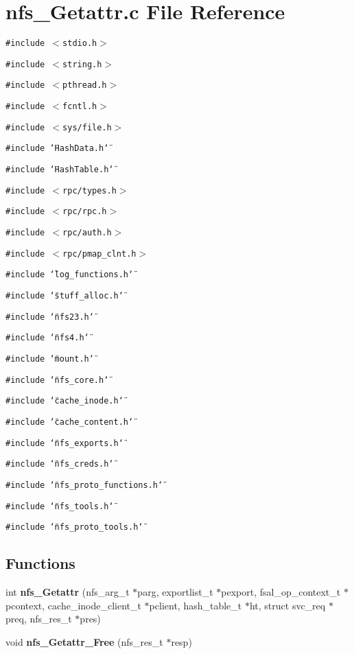\section{nfs\_\-Getattr.c File Reference}
\label{nfs__Getattr_8c}
{\tt \#include $<$stdio.h$>$}\par
{\tt \#include $<$string.h$>$}\par
{\tt \#include $<$pthread.h$>$}\par
{\tt \#include $<$fcntl.h$>$}\par
{\tt \#include $<$sys/file.h$>$}\par
{\tt \#include \char`\"{}HashData.h\char`\"{}}\par
{\tt \#include \char`\"{}HashTable.h\char`\"{}}\par
{\tt \#include $<$rpc/types.h$>$}\par
{\tt \#include $<$rpc/rpc.h$>$}\par
{\tt \#include $<$rpc/auth.h$>$}\par
{\tt \#include $<$rpc/pmap\_\-clnt.h$>$}\par
{\tt \#include \char`\"{}log\_\-functions.h\char`\"{}}\par
{\tt \#include \char`\"{}stuff\_\-alloc.h\char`\"{}}\par
{\tt \#include \char`\"{}nfs23.h\char`\"{}}\par
{\tt \#include \char`\"{}nfs4.h\char`\"{}}\par
{\tt \#include \char`\"{}mount.h\char`\"{}}\par
{\tt \#include \char`\"{}nfs\_\-core.h\char`\"{}}\par
{\tt \#include \char`\"{}cache\_\-inode.h\char`\"{}}\par
{\tt \#include \char`\"{}cache\_\-content.h\char`\"{}}\par
{\tt \#include \char`\"{}nfs\_\-exports.h\char`\"{}}\par
{\tt \#include \char`\"{}nfs\_\-creds.h\char`\"{}}\par
{\tt \#include \char`\"{}nfs\_\-proto\_\-functions.h\char`\"{}}\par
{\tt \#include \char`\"{}nfs\_\-tools.h\char`\"{}}\par
{\tt \#include \char`\"{}nfs\_\-proto\_\-tools.h\char`\"{}}\par
\subsection*{Functions}
\begin{CompactItemize}
\item 
int {\bf nfs\_\-Getattr} (nfs\_\-arg\_\-t $\ast$parg, exportlist\_\-t $\ast$pexport, fsal\_\-op\_\-context\_\-t $\ast$pcontext, cache\_\-inode\_\-client\_\-t $\ast$pclient, hash\_\-table\_\-t $\ast$ht, struct svc\_\-req $\ast$preq, nfs\_\-res\_\-t $\ast$pres)
\item 
void {\bf nfs\_\-Getattr\_\-Free} (nfs\_\-res\_\-t $\ast$resp)
\end{CompactItemize}


